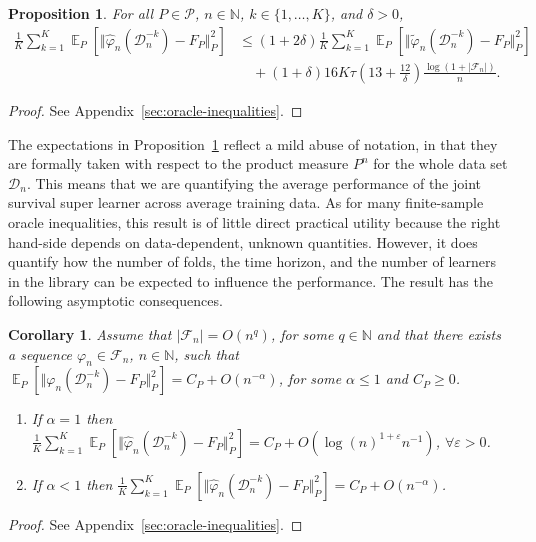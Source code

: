 \documentclass[a4paper,danish]{article}
\theoremstyle{plain} %
\numberwithin{theorem}{section}
\newtheorem{proposition}[theorem]{Proposition}
\newtheorem{corollary}[theorem]{Corollary}
\theoremstyle{definition} %
\theoremstyle{remark}
\DeclareMathOperator{\E}{\mathbb{E}} %
\newcommand{\N}{\mathbb{N}}
\renewcommand{\phi}{\varphi}
\renewcommand{\epsilon}{\varepsilon}
\newcommand\bigO{\textit{O}}
\newcommand{\1}{\mathds{1}}
\newcommand{\data}{\ensuremath{\mathcal{D}}}
\begin{document}
\begin{proposition}
  \label{prop:oracle-prop}
  For all \(P\in\mathcal{P}\), \( n \in \N \), \( k \in \{1, \dots, K\} \),
  and $\delta>0$,
  \begin{align*}
    \frac{1}{K}\sum_{k=1}^{K} \E_{P}{\left[ \Vert \hat{\phi}_n(\data_n^{-k}) - F_P \Vert_{P}^2 \right]}
    & \leq (1 + 2\delta)
      \frac{1}{K}\sum_{k=1}^{K} \E_{P}{\left[ \Vert \tilde{\phi}_n(\data_n^{-k}) - F_P \Vert_{P}^2 \right]}
    \\
    & \quad
      + (1+ \delta) 16   K \tau
      \left(
      13 + \frac{12}{\delta}
      \right)
      \frac{\log(1 + |\mathcal{F}_n|)}{n}.
  \end{align*}
\end{proposition}
\begin{proof}
  See Appendix~\ref{sec:oracle-inequalities}.
\end{proof}

The expectations in Proposition~\ref{prop:oracle-prop} reflect a mild
abuse of notation, in that they are formally taken with respect to the
product measure \( P^{n} \) for the whole data set \( \data_n \). This
means that we are quantifying the average performance of the joint survival super learner across
average training data. As for many finite-sample oracle inequalities,
this result is of little direct practical utility because the right
hand-side depends on data-dependent, unknown quantities. However, it
does quantify how the number of folds, the time horizon, and the
number of learners in the library can be expected to influence the
performance. The result has the following asymptotic consequences.

\begin{corollary}
  \label{cor:asymp-cons}
  Assume that \( |\mathcal{F}_n| = \bigO(n^q)\), for some
  \( q \in \N \) and that there exists a sequence
  \( \phi_n \in \mathcal{F}_n \), \( n \in \N \), such that
  \(  \E_{P}{\left[ \Vert
      \phi_n(\data_n^{-k}) - F_P \Vert_{P}^2 \right]} = C_P +
  \bigO(n^{-\alpha}) \), for some \( \alpha\leq 1 \) and
  \( C_P \geq 0 \).
  \begin{enumerate}[label=(\alph*)]
  \item\label{item:1} If $\alpha=1$ then
    \(\frac{1}{K}\sum_{k=1}^{K} \E_{P}{\left[ \Vert
        \hat{\phi}_n(\data_n^{-k}) - F_P \Vert_{P}^2 \right]} = C_P +
    \bigO(\log(n)^{1+\epsilon}n^{-1}) \), $\forall\epsilon>0$.
  \item\label{item:2} If $\alpha<1$ then
    \(\frac{1}{K}\sum_{k=1}^{K} \E_{P}{\left[ \Vert
        \hat{\phi}_n(\data_n^{-k}) - F_P \Vert_{P}^2 \right]} = C_P +
    \bigO(n^{-\alpha}) \).
  \end{enumerate}
\end{corollary}
\begin{proof}
  See Appendix~\ref{sec:oracle-inequalities}.
\end{proof}
\end{document}

